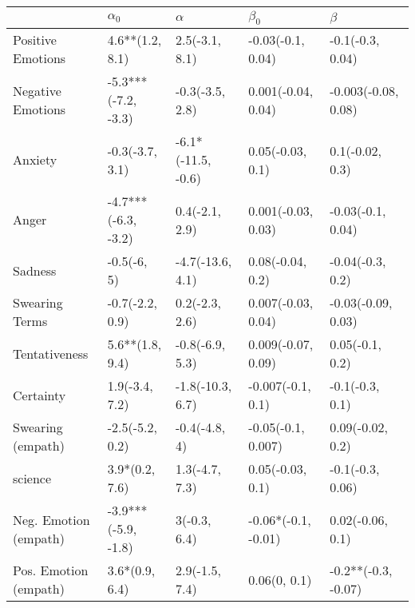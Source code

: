 \begin{tabular}{lllll}
\toprule
{} &           $\alpha_0$ &            $\alpha$ &            $\beta_0$ &              $\beta$ \\
\midrule
Positive Emotions     &      4.6**(1.2, 8.1) &      2.5(-3.1, 8.1) &    -0.03(-0.1, 0.04) &     -0.1(-0.3, 0.04) \\
Negative Emotions     &  -5.3***(-7.2, -3.3) &     -0.3(-3.5, 2.8) &   0.001(-0.04, 0.04) &  -0.003(-0.08, 0.08) \\
Anxiety               &      -0.3(-3.7, 3.1) &  -6.1*(-11.5, -0.6) &     0.05(-0.03, 0.1) &      0.1(-0.02, 0.3) \\
Anger                 &  -4.7***(-6.3, -3.2) &      0.4(-2.1, 2.9) &   0.001(-0.03, 0.03) &    -0.03(-0.1, 0.04) \\
Sadness               &          -0.5(-6, 5) &    -4.7(-13.6, 4.1) &     0.08(-0.04, 0.2) &     -0.04(-0.3, 0.2) \\
Swearing Terms        &      -0.7(-2.2, 0.9) &      0.2(-2.3, 2.6) &   0.007(-0.03, 0.04) &   -0.03(-0.09, 0.03) \\
Tentativeness         &      5.6**(1.8, 9.4) &     -0.8(-6.9, 5.3) &   0.009(-0.07, 0.09) &      0.05(-0.1, 0.2) \\
Certainty             &       1.9(-3.4, 7.2) &    -1.8(-10.3, 6.7) &    -0.007(-0.1, 0.1) &      -0.1(-0.3, 0.1) \\
Swearing (empath)     &      -2.5(-5.2, 0.2) &       -0.4(-4.8, 4) &   -0.05(-0.1, 0.007) &     0.09(-0.02, 0.2) \\
science               &       3.9*(0.2, 7.6) &      1.3(-4.7, 7.3) &     0.05(-0.03, 0.1) &     -0.1(-0.3, 0.06) \\
Neg. Emotion (empath) &  -3.9***(-5.9, -1.8) &        3(-0.3, 6.4) &  -0.06*(-0.1, -0.01) &     0.02(-0.06, 0.1) \\
Pos. Emotion (empath) &       3.6*(0.9, 6.4) &      2.9(-1.5, 7.4) &         0.06(0, 0.1) &  -0.2**(-0.3, -0.07) \\
\bottomrule
\end{tabular}
